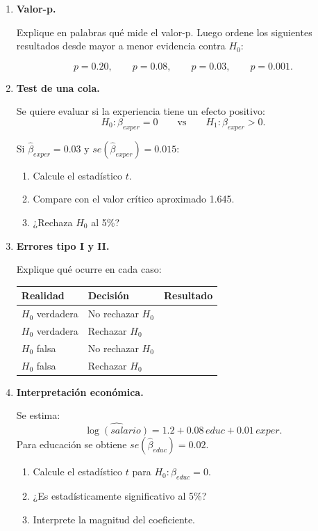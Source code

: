 \documentclass[11pt]{article}
\begin{document}
\begin{enumerate}[label=\textbf{Ejercicio \arabic*.}, leftmargin=*]
\item \textbf{Valor-p.}

Explique en palabras qué mide el valor-p. Luego ordene los siguientes resultados desde mayor a menor evidencia contra \(H_0\):

\[
p=0.20,\qquad p=0.08,\qquad p=0.03,\qquad p=0.001.
\]

\item \textbf{Test de una cola.}

Se quiere evaluar si la experiencia tiene un efecto positivo:
\[
H_0:\beta_{exper}=0
\qquad\text{vs}\qquad
H_1:\beta_{exper}>0.
\]

Si \(\hat{\beta}_{exper}=0.03\) y \(se(\hat{\beta}_{exper})=0.015\):

\begin{enumerate}[label=\alph*)]
    \item Calcule el estadístico \(t\).
    \item Compare con el valor crítico aproximado 1.645.
    \item ¿Rechaza \(H_0\) al 5\%?
\end{enumerate}

\item \textbf{Errores tipo I y II.}

Explique qué ocurre en cada caso:

\begin{center}
\begin{tabular}{lll}
\toprule
Realidad & Decisión & Resultado \\
\midrule
\(H_0\) verdadera & No rechazar \(H_0\) & \\
\(H_0\) verdadera & Rechazar \(H_0\) & \\
\(H_0\) falsa & No rechazar \(H_0\) & \\
\(H_0\) falsa & Rechazar \(H_0\) & \\
\bottomrule
\end{tabular}
\end{center}

\item \textbf{Interpretación económica.}

Se estima:
\[
\widehat{\log(salario)}=1.2+0.08\,educ+0.01\,exper.
\]
Para educación se obtiene \(se(\hat{\beta}_{educ})=0.02\).

\begin{enumerate}[label=\alph*)]
    \item Calcule el estadístico \(t\) para \(H_0:\beta_{educ}=0\).
    \item ¿Es estadísticamente significativo al 5\%?
    \item Interprete la magnitud del coeficiente.
\end{enumerate}


\end{enumerate}
\end{document}
